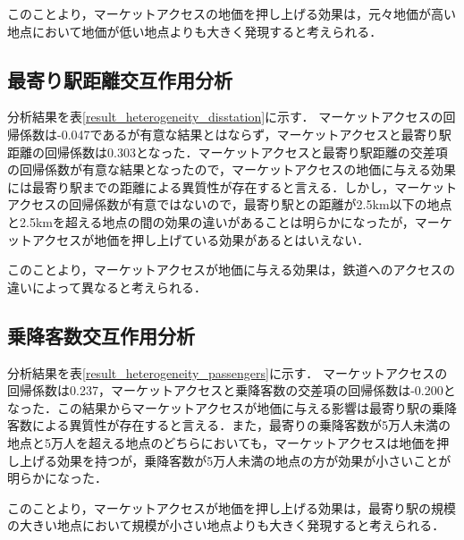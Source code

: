 このことより，マーケットアクセスの地価を押し上げる効果は，元々地価が高い地点において地価が低い地点よりも大きく発現すると考えられる．


\subsection{最寄り駅距離交互作用分析}
分析結果を表\ref{result_heterogeneity_disstation}に示す．
マーケットアクセスの回帰係数は-0.047であるが有意な結果とはならず，マーケットアクセスと最寄り駅距離の回帰係数は0.303となった．マーケットアクセスと最寄り駅距離の交差項の回帰係数が有意な結果となったので，マーケットアクセスの地価に与える効果には最寄り駅までの距離による異質性が存在すると言える．しかし，マーケットアクセスの回帰係数が有意ではないので，最寄り駅との距離が2.5km以下の地点と2.5kmを超える地点の間の効果の違いがあることは明らかになったが，マーケットアクセスが地価を押し上げている効果があるとはいえない．

このことより，マーケットアクセスが地価に与える効果は，鉄道へのアクセスの違いによって異なると考えられる．

\subsection{乗降客数交互作用分析}
分析結果を表\ref{result_heterogeneity_passengers}に示す．
マーケットアクセスの回帰係数は0.237，マーケットアクセスと乗降客数の交差項の回帰係数は-0.200となった．この結果からマーケットアクセスが地価に与える影響は最寄り駅の乗降客数による異質性が存在すると言える．また，最寄りの乗降客数が5万人未満の地点と5万人を超える地点のどちらにおいても，マーケットアクセスは地価を押し上げる効果を持つが，乗降客数が5万人未満の地点の方が効果が小さいことが明らかになった．

このことより，マーケットアクセスが地価を押し上げる効果は，最寄り駅の規模の大きい地点において規模が小さい地点よりも大きく発現すると考えられる．
